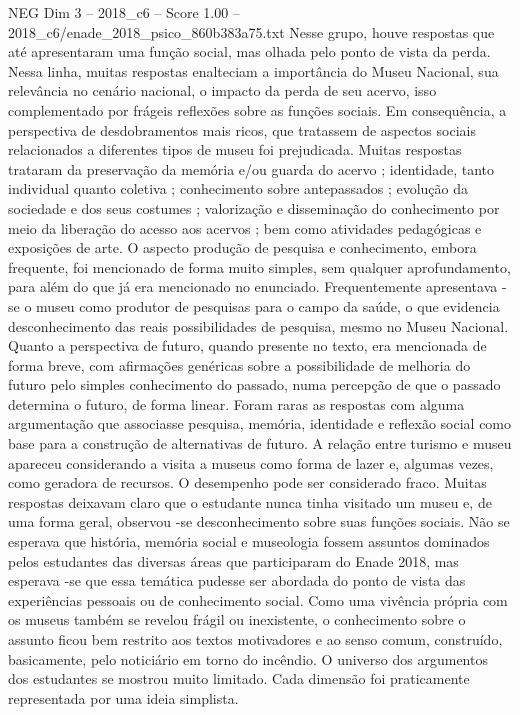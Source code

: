 \begin{textsample}{NEG Dim 3 – 2018\_c6 – Score 1.00 – 2018\_c6/enade\_2018\_psico\_860b383a75.txt}
Nesse grupo, houve respostas que até apresentaram uma função social, mas olhada pelo ponto de vista da perda.
Nessa linha, muitas respostas enalteciam a importância do Museu Nacional, sua relevância no cenário nacional, o impacto da perda de seu acervo, isso complementado por frágeis reflexões sobre as funções sociais.
Em consequência, a perspectiva de desdobramentos mais ricos, que tratassem de aspectos sociais relacionados a diferentes tipos de museu foi prejudicada.
Muitas respostas trataram da preservação da memória e/ou guarda do acervo ; identidade, tanto individual quanto coletiva ; conhecimento sobre antepassados ; evolução da sociedade e dos seus costumes ; valorização e disseminação do conhecimento por meio da liberação do acesso aos acervos ; bem como atividades pedagógicas e exposições de arte.
O aspecto produção de pesquisa e conhecimento, embora frequente, foi mencionado de forma muito simples, sem qualquer aprofundamento, para além do que já era mencionado no enunciado.
Frequentemente apresentava -se o museu como produtor de pesquisas para o campo da saúde, o que evidencia desconhecimento das reais possibilidades de pesquisa, mesmo no Museu Nacional.
Quanto a perspectiva de futuro, quando presente no texto, era mencionada de forma breve, com afirmações genéricas sobre a possibilidade de melhoria do futuro pelo simples conhecimento do passado, numa percepção de que o passado determina o futuro, de forma linear.
Foram raras as respostas com alguma argumentação que associasse pesquisa, memória, identidade e reflexão social como base para a construção de alternativas de futuro.
A relação entre turismo e museu apareceu considerando a visita a museus como forma de lazer e, algumas vezes, como geradora de recursos.
O desempenho pode ser considerado fraco.
Muitas respostas deixavam claro que o estudante nunca tinha visitado um museu e, de uma forma geral, observou -se desconhecimento sobre suas funções sociais.
Não se esperava que história, memória social e museologia fossem assuntos dominados pelos estudantes das diversas áreas que participaram do Enade 2018, mas esperava -se que essa temática pudesse ser abordada do ponto de vista das experiências pessoais ou de conhecimento social.
Como uma vivência própria com os museus também se revelou frágil ou inexistente, o conhecimento sobre o assunto ficou bem restrito aos textos motivadores e ao senso comum, construído, basicamente, pelo noticiário em torno do incêndio.
O universo dos argumentos dos estudantes se mostrou muito limitado.
Cada dimensão foi praticamente representada por uma ideia simplista.

\end{textsample}
